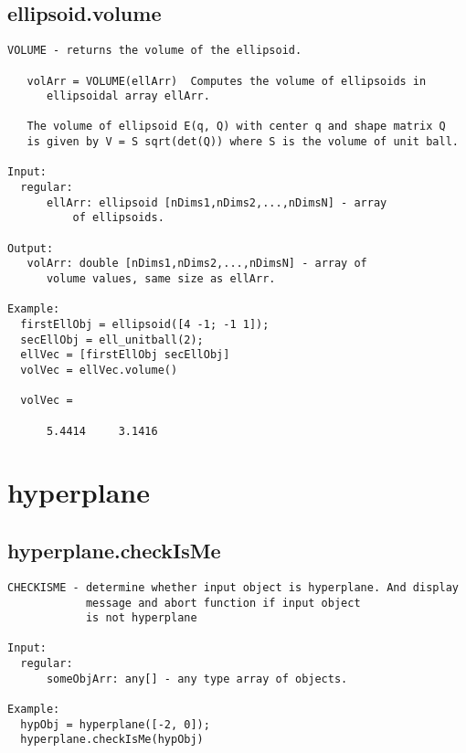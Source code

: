 \subsection{\texorpdfstring{ellipsoid.volume}{volume}}\label{method:ellipsoid.volume}
\begin{verbatim}
VOLUME - returns the volume of the ellipsoid.

   volArr = VOLUME(ellArr)  Computes the volume of ellipsoids in
      ellipsoidal array ellArr.

   The volume of ellipsoid E(q, Q) with center q and shape matrix Q
   is given by V = S sqrt(det(Q)) where S is the volume of unit ball.

Input:
  regular:
      ellArr: ellipsoid [nDims1,nDims2,...,nDimsN] - array
          of ellipsoids.

Output:
   volArr: double [nDims1,nDims2,...,nDimsN] - array of
      volume values, same size as ellArr.

Example:
  firstEllObj = ellipsoid([4 -1; -1 1]);
  secEllObj = ell_unitball(2);
  ellVec = [firstEllObj secEllObj]
  volVec = ellVec.volume()

  volVec =

      5.4414     3.1416
\end{verbatim}
\section{hyperplane}\label{secClassDescr:hyperplane}
\subsection{\texorpdfstring{hyperplane.checkIsMe}{checkIsMe}}\label{method:hyperplane.checkIsMe}
\begin{verbatim}
CHECKISME - determine whether input object is hyperplane. And display
            message and abort function if input object
            is not hyperplane

Input:
  regular:
      someObjArr: any[] - any type array of objects.

Example:
  hypObj = hyperplane([-2, 0]);
  hyperplane.checkIsMe(hypObj)
\end{verbatim}

